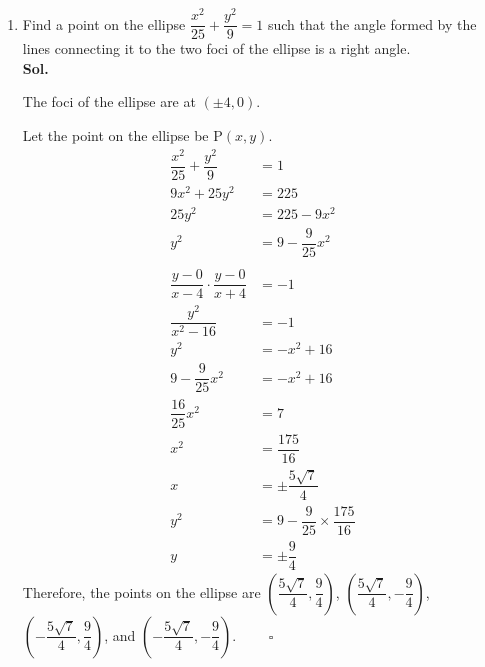 \documentclass{report}
\newcommand{\sol}{\vspace{1em}\\\textbf{Sol.}}
\newcommand{\eos}{ \qquad \square}
\begin{document}
\begin{enumerate}
          \newpage
    \item Find a point on the ellipse $\dfrac{x^2}{25} + \dfrac{y^2}{9} = 1$ such that
          the angle formed by the lines connecting it to the two foci of the ellipse is a
          right angle. \sol{}

          The foci of the ellipse are at $(\pm 4, 0)$.

          Let the point on the ellipse be $\mathrm{P}(x, y)$.
          \begin{align*}
              \dfrac{x^2}{25} + \dfrac{y^2}{9}                & = 1                                      \\
              9x^2 + 25y^2                                    & = 225                                    \\
              25y^2                                           & = 225 - 9x^2                             \\
              y^2                                             & = 9 - \dfrac{9}{25}x^2                   \\
              \\
              \dfrac{y - 0}{x - 4} \cdot \dfrac{y - 0}{x + 4} & = -1                                     \\
              \dfrac{y^2}{x^2 - 16}                           & = -1                                     \\
              y^2                                             & = -x^2 + 16                              \\
              9 - \dfrac{9}{25}x^2                            & = -x^2 + 16                              \\
              \dfrac{16}{25}x^2                               & = 7                                      \\
              x^2                                             & = \dfrac{175}{16}                        \\
              x                                               & = \pm \dfrac{5\sqrt{7}}{4}               \\
              y^2                                             & = 9 - \dfrac{9}{25}\times\dfrac{175}{16} \\
              y                                               & = \pm \dfrac{9}{4}
          \end{align*}
          Therefore, the points on the ellipse are $\left(\dfrac{5\sqrt{7}}{4}, \dfrac{9}{4}\right)$, $\left(\dfrac{5\sqrt{7}}{4}, -\dfrac{9}{4}\right)$, $\left(-\dfrac{5\sqrt{7}}{4}, \dfrac{9}{4}\right)$, and $\left(-\dfrac{5\sqrt{7}}{4}, -\dfrac{9}{4}\right).$ $\eos$


\end{enumerate}
\end{document}
